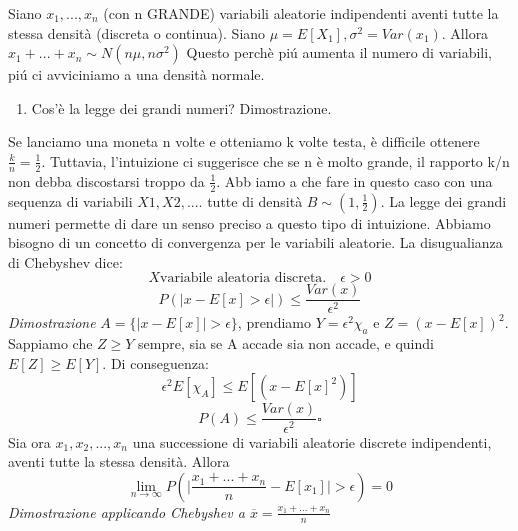 Siano $x_1,...,x_n$ (con n GRANDE) variabili aleatorie indipendenti aventi tutte la stessa densità (discreta o continua). Siano  $\mu =  E[X_1],  \sigma^2 = Var(x_1)$.\newline
Allora  $x_1+...+x_n \sim N(n\mu, n\sigma^2)$
Questo perchè piú aumenta il numero di variabili, piú ci avviciniamo a una densità normale.
\begin{enumerate}[resume]\bfseries
	\item Cos'è la legge dei grandi numeri? Dimostrazione.
\end{enumerate}
Se lanciamo una moneta n volte e otteniamo k volte testa, è difficile  ottenere $\frac{k}{n} = \frac{1}{2}$. Tuttavia, l'intuizione
ci suggerisce che se n è molto grande, il rapporto k/n non debba discostarsi troppo da $\frac{1}{2}$. Abb
iamo a che fare in questo caso con una sequenza di variabili $X1, X2, ...$. tutte di densità $B  \sim (1, \frac{1}{2})$.\newline
La legge dei grandi numeri permette di dare un senso preciso a questo tipo di intuizione. Abbiamo bisogno di un concetto di convergenza per le variabili aleatorie.\newline
La disugualianza di Chebyshev dice: \newline
\[X \text{variabile aleatoria discreta}. \quad \epsilon > 0\]
\[ P(\vert x- E[x] > \epsilon \vert) \le \frac{Var(x)}{\epsilon^2}\]
\textit{Dimostrazione} \newline
$A= \{\vert x-E[x] \vert > \epsilon \}$, prendiamo $Y= \epsilon^2  \chi_a$ e $Z= (x- E[x])^2$.
Sappiamo che $Z \ge Y$ sempre, sia se A accade sia non accade, e quindi $E[Z] \ge E[Y]$.
Di conseguenza:
\[ \epsilon^2 E[\chi_A] \le E[(x-E[x]^2)]\]
\[P(A) \le \frac{Var(x)}{\epsilon^2}  \square\]
Sia ora $x_1,x_2,...,x_n$ una successione di variabili aleatorie discrete indipendenti, aventi tutte la stessa densità.\newline
Allora
\[\lim_{n\to\infty} P(\vert \frac{x_1 + ... + x_n}{n} - E[x_1] \vert >\epsilon) = 0\]
\textit{Dimostrazione applicando Chebyshev a $\overline{x} = \frac{x_1 + ... + x_n}{n} $ }
